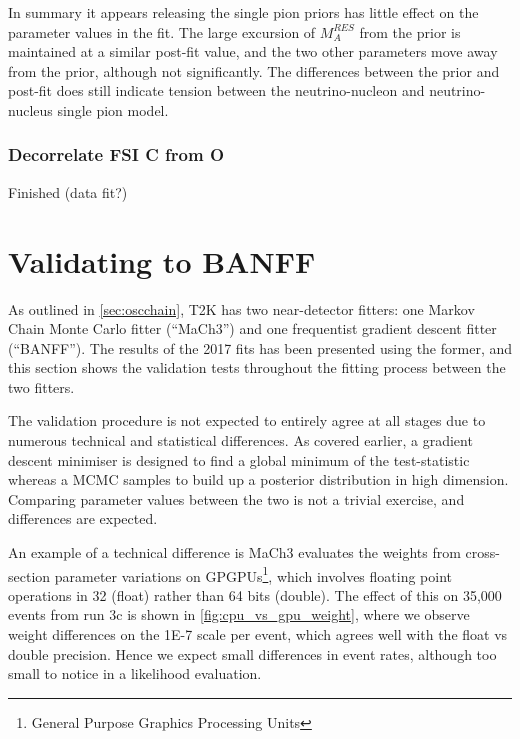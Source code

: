 In summary it appears releasing the single pion priors has little effect on the parameter values in the fit. The large excursion of $M_A^{RES}$ from the prior is maintained at a similar post-fit value, and the two other parameters move away from the prior, although not significantly. The differences between the prior and post-fit does still indicate tension between the neutrino-nucleon and neutrino-nucleus single pion model.

\subsubsection{Decorrelate FSI C from O}
Finished (data fit?)

\section{Validating to BANFF}
As outlined in \autoref{sec:oscchain}, T2K has two near-detector fitters: one Markov Chain Monte Carlo fitter (``MaCh3'') and one frequentist gradient descent fitter (``BANFF''). The results of the 2017 fits has been presented using the former, and this section shows the validation tests throughout the fitting process between the two fitters.

The validation procedure is not expected to entirely agree at all stages due to numerous technical and statistical differences. As covered earlier, a gradient descent minimiser is designed to find a global minimum of the test-statistic whereas a MCMC samples to build up a posterior distribution in high dimension. Comparing parameter values between the two is not a trivial exercise, and differences are expected. 

An example of a technical difference is MaCh3 evaluates the weights from cross-section parameter variations on GPGPUs\footnote{General Purpose Graphics Processing Units}, which involves floating point operations in 32 (float) rather than 64 bits (double). The effect of this on 35,000 events from run 3c is shown in \autoref{fig:cpu_vs_gpu_weight}, where we observe weight differences on the 1E-7 scale per event, which agrees well with the float vs double precision. Hence we expect small differences in event rates, although too small to notice in a likelihood evaluation.

